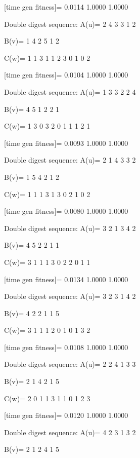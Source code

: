 [time gen fitness]=
    0.0114    1.0000    1.0000

Double digest sequence:
A(u)=
     2     4     3     3     1     2

B(v)=
     1     4     2     5     1     2

C(w)=
     1     1     3     1     1     2     3     0     1     0     2

[time gen fitness]=
    0.0104    1.0000    1.0000

Double digest sequence:
A(u)=
     1     3     3     2     2     4

B(v)=
     4     5     1     2     2     1

C(w)=
     1     3     0     3     2     0     1     1     1     2     1

[time gen fitness]=
    0.0093    1.0000    1.0000

Double digest sequence:
A(u)=
     2     1     4     3     3     2

B(v)=
     1     5     4     2     1     2

C(w)=
     1     1     1     3     1     3     0     2     1     0     2

[time gen fitness]=
    0.0080    1.0000    1.0000

Double digest sequence:
A(u)=
     3     2     1     3     4     2

B(v)=
     4     5     2     2     1     1

C(w)=
     3     1     1     1     3     0     2     2     0     1     1

[time gen fitness]=
    0.0134    1.0000    1.0000

Double digest sequence:
A(u)=
     3     2     3     1     4     2

B(v)=
     4     2     2     1     1     5

C(w)=
     3     1     1     1     2     0     1     0     1     3     2

[time gen fitness]=
    0.0108    1.0000    1.0000

Double digest sequence:
A(u)=
     2     2     4     1     3     3

B(v)=
     2     1     4     2     1     5

C(w)=
     2     0     1     1     3     1     1     0     1     2     3

[time gen fitness]=
    0.0120    1.0000    1.0000

Double digest sequence:
A(u)=
     4     2     3     1     3     2

B(v)=
     2     1     2     4     1     5

